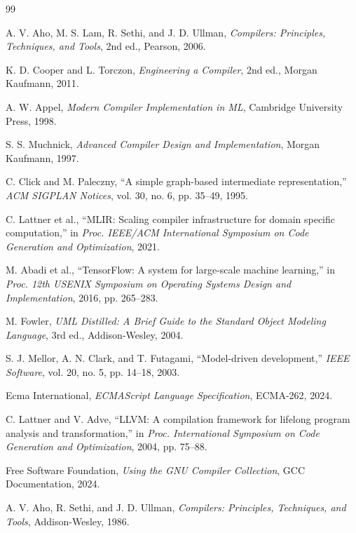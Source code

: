 \documentclass[12pt,a4paper]{article}
\begin{document}
\newpage

\begin{thebibliography}{99}

A. V. Aho, M. S. Lam, R. Sethi, and J. D. Ullman,
\textit{Compilers: Principles, Techniques, and Tools},
2nd ed., Pearson, 2006.

K. D. Cooper and L. Torczon,
\textit{Engineering a Compiler},
2nd ed., Morgan Kaufmann, 2011.

A. W. Appel,
\textit{Modern Compiler Implementation in ML},
Cambridge University Press, 1998.

S. S. Muchnick,
\textit{Advanced Compiler Design and Implementation},
Morgan Kaufmann, 1997.

C. Click and M. Paleczny,
``A simple graph-based intermediate representation,''
\textit{ACM SIGPLAN Notices}, vol. 30, no. 6, pp. 35--49, 1995.

C. Lattner et al.,
``MLIR: Scaling compiler infrastructure for domain specific computation,''
in \textit{Proc. IEEE/ACM International Symposium on Code Generation and
Optimization}, 2021.

M. Abadi et al.,
``TensorFlow: A system for large-scale machine learning,''
in \textit{Proc. 12th USENIX Symposium on Operating Systems Design and
Implementation}, 2016, pp. 265--283.

M. Fowler,
\textit{UML Distilled: A Brief Guide to the Standard Object Modeling Language},
3rd ed., Addison-Wesley, 2004.

S. J. Mellor, A. N. Clark, and T. Futagami,
``Model-driven development,'' 
\textit{IEEE Software}, vol. 20, no. 5, pp. 14--18, 2003.

Ecma International,
\textit{ECMAScript Language Specification},
ECMA-262, 2024.

C. Lattner and V. Adve,
``LLVM: A compilation framework for lifelong program analysis and
transformation,''
in \textit{Proc. International Symposium on Code Generation and Optimization},
2004, pp. 75--88.

Free Software Foundation,
\textit{Using the GNU Compiler Collection},
GCC Documentation, 2024.

A. V. Aho, R. Sethi, and J. D. Ullman,
\textit{Compilers: Principles, Techniques, and Tools},
Addison-Wesley, 1986.


\end{thebibliography}
\end{document}

